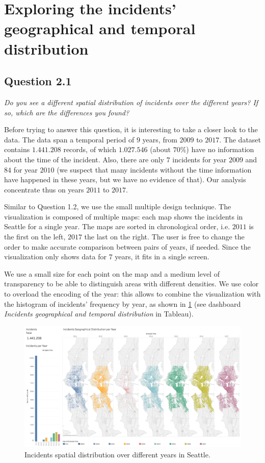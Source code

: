 \section{Exploring the incidents' geographical and temporal distribution}

\subsection*{Question 2.1}
\textit{Do you see a different spatial distribution of incidents over the different years? If so, which are the differences you found?}

Before trying to answer this question, it is interesting to take a closer look to the data.
The data span a temporal period of $9$ years, from $2009$ to $2017$.
The dataset contains $1.441.208$ records, of which $1.027.546$ (about $70\%$) have no information about the time of the incident.
Also, there are only $7$ incidents for year $2009$ and $84$ for year $2010$ (we suspect that many incidents without the time information have happened in these years, but we have no evidence of that).
Our analysis concentrate thus on years $2011$ to $2017$.

Similar to Question 1.2, we use the small multiple design technique.
The visualization is composed of multiple maps: each map shows the incidents in Seattle for a single year.
The maps are sorted in chronological order, i.e. $2011$ is the first on the left, $2017$ the last on the right.
The user is free to change the order to make accurate comparison between pairs of years, if needed.
Since the visualization only shows data for $7$ years, it fits in a single screen.

We use a small size for each point on the map and a medium level of transparency to be able to distinguish areas with different densities.
We use color to overload the encoding of the year:
this allows to combine the visualization with the histogram of incidents' frequency by year, as shown in \cref{fig:2_1_geographical_temporal_distribution} (see dashboard \textit{Incidents geographical and temporal distribution} in Tableau).

\begin{figure}[h]
	\centering
	\includegraphics[width=\columnwidth]{figures/2_1_geographical_temporal_distribution}
	\caption{Incidents spatial distribution over different years in Seattle.}
	\label{fig:2_1_geographical_temporal_distribution}
\end{figure}

